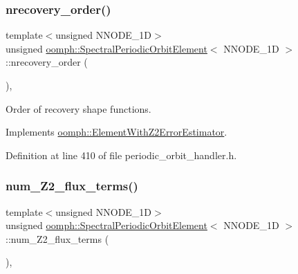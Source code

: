 \subsubsection{\texorpdfstring{nrecovery\+\_\+order()}{nrecovery\_order()}}
{\footnotesize\ttfamily template$<$unsigned N\+N\+O\+D\+E\+\_\+1D$>$ \\
unsigned \hyperlink{classoomph_1_1SpectralPeriodicOrbitElement}{oomph\+::\+Spectral\+Periodic\+Orbit\+Element}$<$ N\+N\+O\+D\+E\+\_\+1D $>$\+::nrecovery\+\_\+order (\begin{DoxyParamCaption}{ }\end{DoxyParamCaption})\hspace{0.3cm}{\ttfamily [inline]}, {\ttfamily [virtual]}}



Order of recovery shape functions. 



Implements \hyperlink{classoomph_1_1ElementWithZ2ErrorEstimator_af39480835bd3e0f6b2f4f7a9a4044798}{oomph\+::\+Element\+With\+Z2\+Error\+Estimator}.



Definition at line 410 of file periodic\+\_\+orbit\+\_\+handler.\+h.

\mbox{\label{classoomph_1_1SpectralPeriodicOrbitElement_a625465ff6702c623efd252d758832445}} 
\subsubsection{\texorpdfstring{num\+\_\+\+Z2\+\_\+flux\+\_\+terms()}{num\_Z2\_flux\_terms()}}
{\footnotesize\ttfamily template$<$unsigned N\+N\+O\+D\+E\+\_\+1D$>$ \\
unsigned \hyperlink{classoomph_1_1SpectralPeriodicOrbitElement}{oomph\+::\+Spectral\+Periodic\+Orbit\+Element}$<$ N\+N\+O\+D\+E\+\_\+1D $>$\+::num\+\_\+\+Z2\+\_\+flux\+\_\+terms (\begin{DoxyParamCaption}{ }\end{DoxyParamCaption})\hspace{0.3cm}{\ttfamily [inline]}, {\ttfamily [virtual]}}



